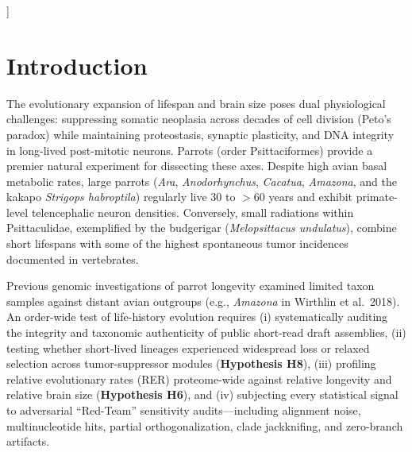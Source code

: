 \documentclass[10pt,a4paper,twocolumn]{article}
\begin{document}
{\begin{@twocolumnfalse}
\begin{abstract}
Psittaculidae ($r_{\text{tip}}$ drops from 0.478 to 0.195 when omitted), and 89.3\% (117/131) of shared single-gene hits (\texttt{PTEN}, \texttt{MAD2L2}, \texttt{HSPA8}, \texttt{CTNNB1}) are ultra-conserved genes with 97--99\% zero-length branches whose residuals mirror the genomic background vector $\pm\sqrt{\text{nv}}$. Separating these ultra-conserved background-coupled hits (Tier A) from 14 informative hits with $\ge 20$ nonzero branches (Tier B, led by \texttt{TKT}, \texttt{PHOSPHO1}, \texttt{SLC4A7}, and \texttt{HUS1}) provides a transparent, stress-tested foundation for parrot macroevolutionary genomics.\par\vspace{4pt}
    \noindent\textbf{Keywords:} Psittaciformes $\cdot$ Peto's Paradox $\cdot$ Longevity $\cdot$ Encephalization $\cdot$ Telomeres (\texttt{RTEL1}, \texttt{TERT}) $\cdot$ \texttt{PTEN} $\cdot$ \texttt{RERconverge} $\cdot$ Statistical Audit
    \end{abstract}
    \vspace{0.25cm}
  \end{@twocolumnfalse}
}]

\section{Introduction}

The evolutionary expansion of lifespan and brain size poses dual physiological challenges: suppressing somatic neoplasia across decades of cell division (Peto's paradox) while maintaining proteostasis, synaptic plasticity, and DNA integrity in long-lived post-mitotic neurons. Parrots (order Psittaciformes) provide a premier natural experiment for dissecting these axes. Despite high avian basal metabolic rates, large parrots (\textit{Ara}, \textit{Anodorhynchus}, \textit{Cacatua}, \textit{Amazona}, and the kakapo \textit{Strigops habroptila}) regularly live 30 to $>60$ years and exhibit primate-level telencephalic neuron densities. Conversely, small radiations within Psittaculidae, exemplified by the budgerigar (\textit{Melopsittacus undulatus}), combine short lifespans with some of the highest spontaneous tumor incidences documented in vertebrates.

Previous genomic investigations of parrot longevity examined limited taxon samples against distant avian outgroups (e.g., \textit{Amazona} in Wirthlin et al.\ 2018). An order-wide test of life-history evolution requires (i) systematically auditing the integrity and taxonomic authenticity of public short-read draft assemblies, (ii) testing whether short-lived lineages experienced widespread loss or relaxed selection across tumor-suppressor modules (\textbf{Hypothesis H8}), (iii) profiling relative evolutionary rates (RER) proteome-wide against relative longevity and relative brain size (\textbf{Hypothesis H6}), and (iv) subjecting every statistical signal to adversarial ``Red-Team'' sensitivity audits—including alignment noise, multinucleotide hits, partial orthogonalization, clade jackknifing, and zero-branch artifacts.
\end{document}
